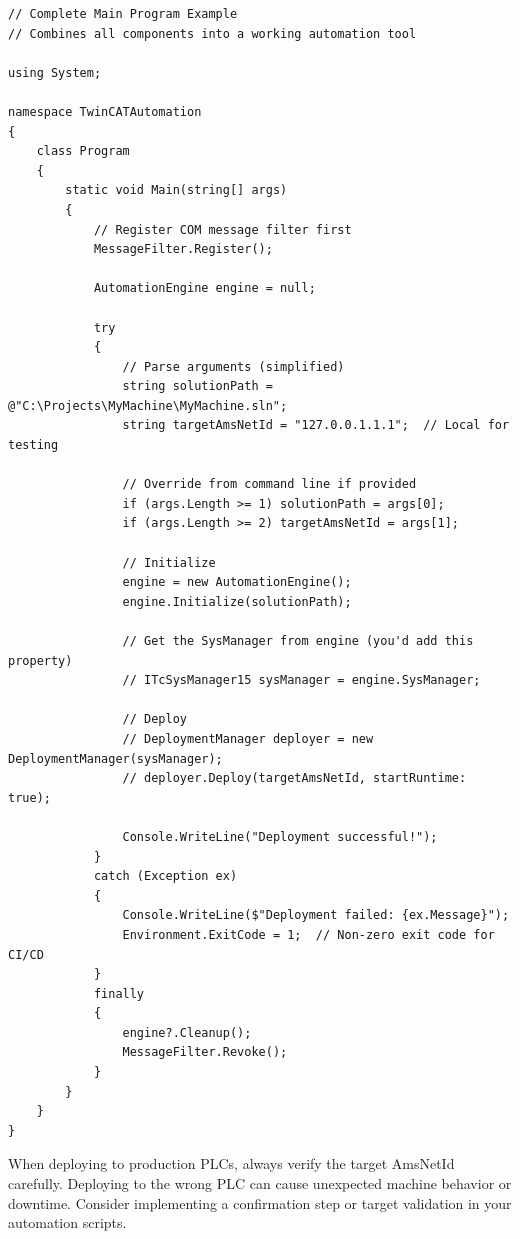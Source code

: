 \documentclass[11pt,a4paper]{article}
\begin{document}
\begin{lstlisting}[style=csharpstyle]
// Complete Main Program Example
// Combines all components into a working automation tool

using System;

namespace TwinCATAutomation
{
    class Program
    {
        static void Main(string[] args)
        {
            // Register COM message filter first
            MessageFilter.Register();
            
            AutomationEngine engine = null;
            
            try
            {
                // Parse arguments (simplified)
                string solutionPath = @"C:\Projects\MyMachine\MyMachine.sln";
                string targetAmsNetId = "127.0.0.1.1.1";  // Local for testing
                
                // Override from command line if provided
                if (args.Length >= 1) solutionPath = args[0];
                if (args.Length >= 2) targetAmsNetId = args[1];
                
                // Initialize
                engine = new AutomationEngine();
                engine.Initialize(solutionPath);
                
                // Get the SysManager from engine (you'd add this property)
                // ITcSysManager15 sysManager = engine.SysManager;
                
                // Deploy
                // DeploymentManager deployer = new DeploymentManager(sysManager);
                // deployer.Deploy(targetAmsNetId, startRuntime: true);
                
                Console.WriteLine("Deployment successful!");
            }
            catch (Exception ex)
            {
                Console.WriteLine($"Deployment failed: {ex.Message}");
                Environment.ExitCode = 1;  // Non-zero exit code for CI/CD
            }
            finally
            {
                engine?.Cleanup();
                MessageFilter.Revoke();
            }
        }
    }
}
\end{lstlisting}

\begin{warningbox}
When deploying to production PLCs, always verify the target AmsNetId carefully. Deploying to the wrong PLC can cause unexpected machine behavior or downtime. Consider implementing a confirmation step or target validation in your automation scripts.
\end{warningbox}
\end{document}
